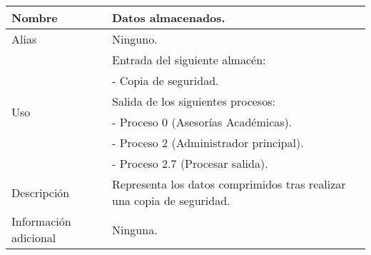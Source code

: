 \begin{center}
  \begin{tabular}{| l | p{9cm} |}
    \hline
    Nombre & \textbf{Datos almacenados}.\\
    \hline
    Alias & Ninguno.\\
    \hline
    \multirow{6}{*}{Uso} & Entrada del siguiente almacén:\\
                         & - Copia de seguridad.\\
                         & Salida de los siguientes procesos:\\
                         & - Proceso 0 (Asesorías Académicas).\\
                         & - Proceso 2 (Administrador principal).\\
                         & - Proceso 2.7 (Procesar salida).\\
    \hline
    Descripción & Representa los datos comprimidos tras realizar una copia de
                  seguridad.\\
    \hline
    Información adicional & Ninguna.\\
    \hline
  \end{tabular}
\end{center}
